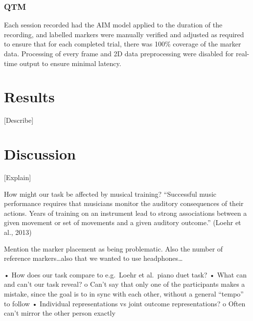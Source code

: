 \documentclass[10pt,a4paper,onecolumn]{article}
\begin{document}
\hypertarget{qtm}{%
\subsubsection{QTM}\label{qtm}}

Each session recorded had the AIM model applied to the duration of the recording, and labelled markers were manually verified and adjusted as required to ensure that for each completed trial, there was 100\% coverage of the marker data. Processing of every frame and 2D data preprocessing were disabled for real-time output to ensure minimal latency.

\hypertarget{results}{%
\section{Results}\label{results}}

{[}Describe{]}

\hypertarget{discussion}{%
\section{Discussion}\label{discussion}}

{[}Explain{]}

How might our task be affected by musical training? ``Successful music performance requires that musicians monitor the auditory consequences of their actions. Years of training on an instrument lead to strong associations between a given movement or set of movements and a given auditory outcome.'' (Loehr et al., 2013)

Mention the marker placement as being problematic. Also the number of reference markers\ldots also that we wanted to use headphones\ldots{}

• How does our task compare to e.g.~Loehr et al.~piano duet task?
• What can and can't our task reveal?
o Can't say that only one of the participants makes a mistake, since the goal is to in sync with each other, without a general ``tempo'' to follow
• Individual representations vs joint outcome representations?
o Often can't mirror the other person exactly
\end{document}
